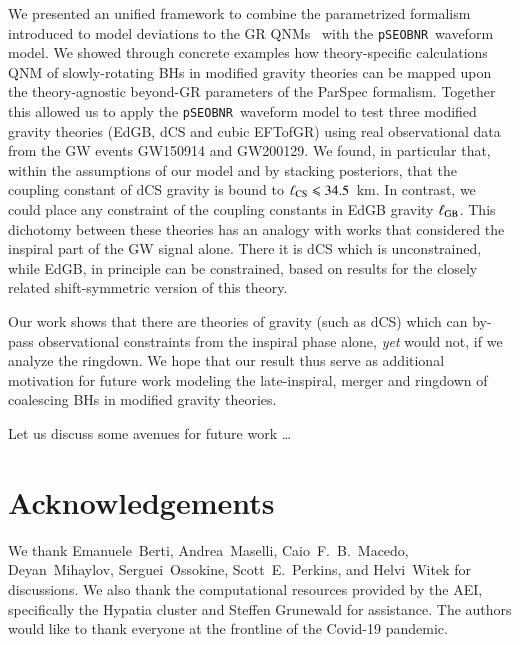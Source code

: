 \documentclass[twocolumn,prd,aps,superscriptaddress,preprintnumbers,tightenlines,showpacs,nofootinbib,amsfonts,amsmath,longbibliography]{revtex4-1}
\newcommand{\pSEOB}{\texttt{pSEOBNR}}
\newcommand{\hs}[1]{{\textcolor{blue}{{[HS: #1]}} }}
\begin{document}
We presented an unified framework to combine the parametrized formalism introduced
to model deviations to the GR QNMs~\cite{Maselli:2019mjd} with the \pSEOB~waveform model.
%
We showed through concrete examples how theory-specific calculations QNM of
slowly-rotating BHs in modified gravity theories can be mapped upon the
theory-agnostic beyond-GR parameters of the {\sc ParSpec} formalism.
%
Together this allowed us to apply the \pSEOB~waveform model to test three
modified gravity theories (EdGB, dCS and cubic EFTofGR) using real
observational data from the GW events GW150914 and GW200129.
%
We found, in particular that, within the assumptions of our model and by
stacking posteriors, that the coupling constant of dCS gravity is bound to
$\ell_{\rm CS} \leqslant 34.5$~km.
%
In contrast, we could place any constraint of the coupling constants in EdGB gravity $\ell_{\rm GB}$.
%
This dichotomy between these theories has an analogy with works that considered the inspiral part of the GW signal alone.
%
There it is dCS which is unconstrained, while EdGB, in principle can be constrained, based on results for the closely
related shift-symmetric version of this theory.

Our work shows that there are theories of gravity (such as dCS) which can by-pass observational
constraints from the inspiral phase alone, {\it yet} would not, if we
analyze the ringdown.
%
We hope that our result thus serve as additional motivation for future work
modeling the late-inspiral, merger and ringdown of coalescing BHs in modified
gravity theories.

Let us discuss some avenues for future work \dots


%


\section*{Acknowledgements}
\label{sec:acknowledgements}
%
We thank Emanuele~Berti, Andrea~Maselli, Caio~F.~B.~Macedo, Deyan~Mihaylov,
Serguei~Ossokine, Scott~E.~Perkins, and Helvi~Witek for discussions.
%
We also thank the computational resources provided by the AEI, specifically the
{\sc Hypatia} cluster and Steffen Grunewald for assistance.
%
The authors would like to thank everyone at the frontline of the Covid-19
pandemic.

% 

\end{document}
